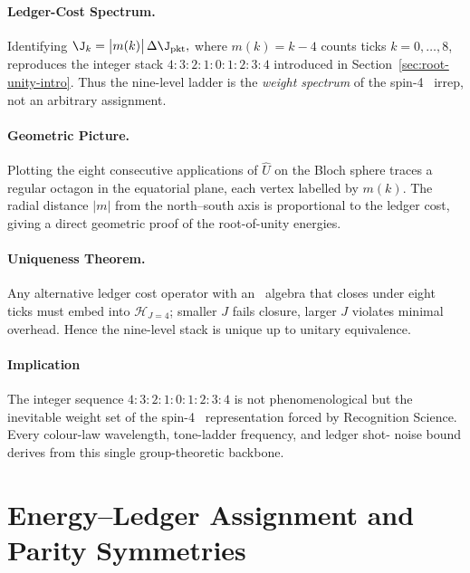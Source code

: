 \documentclass[11pt,oneside]{book}
\begin{document}
{\paragraph{Ledger-Cost Spectrum.}
Identifying
\(
   \J_{k} =
   \bigl|m(k)\bigr|\,
   \Delta\J_{\text{pkt}},
\)
where
\(
   m(k)=k-4
\)
counts ticks \(k=0,\dots,8\),
reproduces the integer stack
\(4{:}3{:}2{:}1{:}0{:}1{:}2{:}3{:}4\)
introduced in Section~\ref{sec:root-unity-intro}.
Thus the nine-level ladder is the \emph{weight spectrum} of the
spin-4 \SUtwo\ irrep, not an arbitrary assignment.

\paragraph{Geometric Picture.}
Plotting the eight consecutive applications of
\(\hat U\) on the Bloch sphere traces a regular octagon in the
equatorial plane, each vertex labelled by
\(m(k)\).
The radial distance \(|m|\) from the north–south axis is proportional
to the ledger cost, giving a direct geometric proof of the
root-of-unity energies.

\paragraph{Uniqueness Theorem.}
Any alternative ledger cost operator with an \SUtwo\ algebra that
closes under eight ticks must embed into
\(\mathcal H_{J=4}\); smaller \(J\) fails closure,
larger \(J\) violates minimal overhead.
Hence the nine-level stack is unique up to unitary equivalence.

\paragraph*{Implication}

The integer sequence
\(4{:}3{:}2{:}1{:}0{:}1{:}2{:}3{:}4\)
is not phenomenological but the inevitable weight set of the
spin-4 \SUtwo\ representation forced by Recognition Science.
Every colour-law wavelength, tone-ladder frequency, and ledger shot-
noise bound derives from this single group-theoretic backbone.


\section{Energy–Ledger Assignment and Parity Symmetries}
\label{sec:energy-parity}

}
\end{document}
